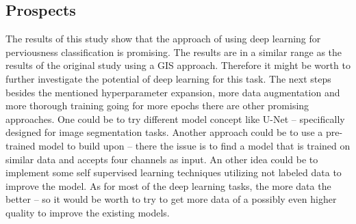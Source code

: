 \subsection{Prospects}

The results of this study show that the approach of using deep learning for perviousness
classification is promising. The results are in a similar range as the results of the
original study using a GIS approach. Therefore it might be worth to further investigate
the potential of deep learning for this task. The next steps besides the mentioned hyperparameter
expansion, more data augmentation and more thorough training going for more epochs there are other
promising approaches. One could be to try different model concept like U-Net -- specifically
designed for image segmentation tasks. Another approach could be to use a pre-trained model
to build upon -- there the issue is to find a model that is trained on similar data and
accepts four channels as input. An other idea could be to implement some self supervised
learning techniques utilizing not labeled data to improve the model. As for most of the deep
learning tasks, the more data the better -- so it would be worth to try to get more data
of a possibly even higher quality to improve the existing models.